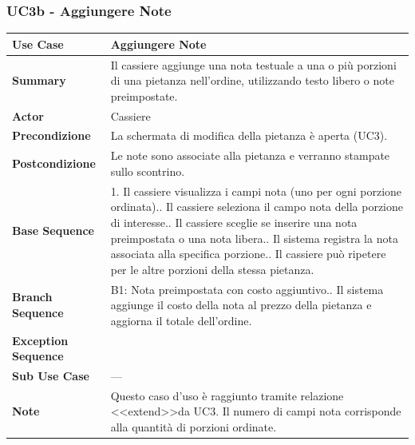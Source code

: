\subsubsection*{UC3b - Aggiungere Note}
\begin{center}
\begin{tabular}{|p{}|p{}|}
\hline
\textbf{Use Case} & Aggiungere Note \\ \hline
\textbf{Summary} & Il cassiere aggiunge una nota testuale a una o più porzioni di una pietanza nell'ordine, utilizzando testo libero o note preimpostate. \\ \hline
\textbf{Actor} & Cassiere \\ \hline
\textbf{Precondizione} & La schermata di modifica della pietanza è aperta (UC3). \\ \hline
\textbf{Postcondizione} & Le note sono associate alla pietanza e verranno stampate sullo scontrino. \\ \hline
\textbf{Base Sequence} & 1. Il cassiere visualizza i campi nota (uno per ogni porzione ordinata).\newline 2. Il cassiere seleziona il campo nota della porzione di interesse.\newline 3. Il cassiere sceglie se inserire una nota preimpostata o una nota libera.\newline 4. Il sistema registra la nota associata alla specifica porzione.\newline 5. Il cassiere può ripetere per le altre porzioni della stessa pietanza. \\ \hline
\textbf{Branch Sequence} & B1: Nota preimpostata con costo aggiuntivo.\newline 4. Il sistema aggiunge il costo della nota al prezzo della pietanza e aggiorna il totale dell'ordine. \\ \hline
\textbf{Exception Sequence} & \\ \hline
\textbf{Sub Use Case} & — \\ \hline
\textbf{Note} & Questo caso d'uso è raggiunto tramite relazione \textless\textless extend\textgreater\textgreater da UC3. Il numero di campi nota corrisponde alla quantità di porzioni ordinate. \\ \hline
\end{tabular}
\end{center}

\newpage 

